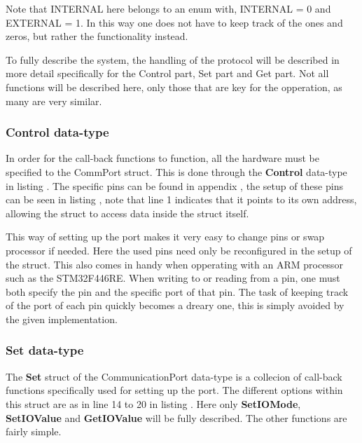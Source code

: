 Note that INTERNAL here belongs to an enum with, INTERNAL = 0 and EXTERNAL = 1. In this way one does not have to keep track of the ones and zeros, but rather the functionality instead.

To fully describe the system, the handling of the protocol will be described in more detail specifically for the Control part, Set part and Get part. Not all functions will be described here, only those that are key for the opperation, as many are very similar.

\subsubsection*{Control data-type}
In order for the call-back functions to function, all the hardware must be specified to the CommPort struct. This is done through the \textbf{Control} data-type in listing . The specific pins can be found in appendix , the setup of these pins can be seen in listing , note that line 1 indicates that it points to its own address, allowing the struct to access data inside the struct itself.



This way of setting up the port makes it very easy to change pins or swap processor if needed. Here the used pins need only be reconfigured in the setup of the struct. This also comes in handy when opperating with an ARM processor such as the STM32F446RE. When writing to or reading from a pin, one must both specify the pin and the specific port of that pin. The task of keeping track of the port of each pin quickly becomes a dreary one, this is simply avoided by the given implementation.

\subsubsection*{Set data-type}
The \textbf{Set} struct of the CommunicationPort data-type is a collecion of call-back functions specifically used for setting up the port. The different options within this struct are as in line 14 to 20 in listing . Here only \textbf{SetIOMode}, \textbf{SetIOValue} and \textbf{GetIOValue} will be fully described. The other functions are fairly simple.

